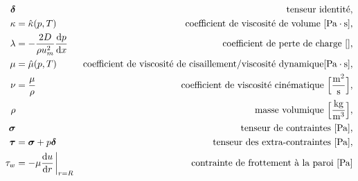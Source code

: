 \begin{align*}
      \bs{\delta} & & \textrm{tenseur identité},\\
      \kappa &= \hat{\kappa}(p, T) & \textrm{coefficient de viscosité de volume } [\si{Pa \cdot s}],\\
      \lambda &= -\frac{2D}{\rho u_m^2} \dv{p}{x} & \textrm{coefficient de perte de charge } [],\\
      \mu &= \hat{\mu}(p,T) & \textrm{coefficient de viscosité de cisaillement/viscosité dynamique} [\si{Pa \cdot s}],\\
      \nu &= \frac{\mu}{\rho} & \textrm{coefficient de viscosité cinématique } \Big[\si{\frac{m^2}{s}} \Big], \\
      \rho & & \textrm{masse volumique } \Big[\si{\frac{kg}{m^3}}\Big],\\
      \bs{\sigma} & & \textrm{tenseur de contraintes } [\si{Pa} ],\\
      \bs{\tau} &= \bs{\sigma} + p \bs{\delta} & \textrm{tenseur des extra-contraintes } [\si{Pa}],\\
      \tau_w &= -\mu \dv{u}{r}\eval_{r=R} & \textrm{contrainte de frottement à la paroi } [\si{Pa}]
    \end{align*}
  \endgroup
